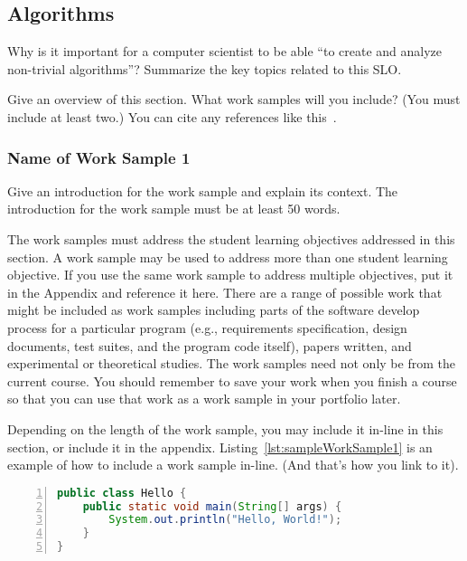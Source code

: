 \subsection{Algorithms}
Why is it important for a computer scientist to be able ``to create and analyze
non-trivial algorithms''?  Summarize the key topics related to this SLO.

Give an overview of this section.  What work samples will you include?
(You must include at least two.)  You can cite any references like
this~\cite{parks:samsfsoal:2009}.

\subsubsection{Name of Work Sample 1}
Give an introduction for the work sample and explain its context.  The
introduction for the work sample must be at least 50 words.

The work samples must address the student learning objectives addressed in
this section.  A work sample may be used to address more than one student
learning objective.  If you use the same work sample to address multiple
objectives, put it in the Appendix and reference it here.
There are a range of possible work that might be
included as work samples including parts of the software develop process
for a particular program (e.g., requirements specification, design documents,
test suites, and the program code itself), papers written, and
experimental or theoretical studies.  The work samples need not only
be from the current course.  You should remember to save your work when
you finish a course so that you can use that work as a work sample in
your portfolio later.

Depending on the length of the work sample, you may include it in-line in
this section, or include it in the appendix.  Listing~\ref{lst:sampleWorkSample1}
is an example of how to include a work sample in-line. (And that's how you
link to it).

\begin{singlespace}
\begin{lstlisting}[float,
                   escapeinside='',
                   basicstyle=\ttfamily\footnotesize,
                   emphstyle=\textbf,
                   numberstyle=\tiny,
                   xleftmargin=.3cm,
                   language=java,
                   numbers=left,
                   numbersep=5pt,
                   firstnumber=auto,
                   stepnumber=1,
                   numberblanklines=true,
                   showspaces=false,
                   showstringspaces=false,
                   showtabs=false,
                   captionpos=b,
                   caption=Yet Another Sample Java Source File,
                   label=lst:sampleWorkSample1]
public class Hello {
    public static void main(String[] args) {
        System.out.println("Hello, World!");
    }
}
\end{lstlisting}
\end{singlespace}

